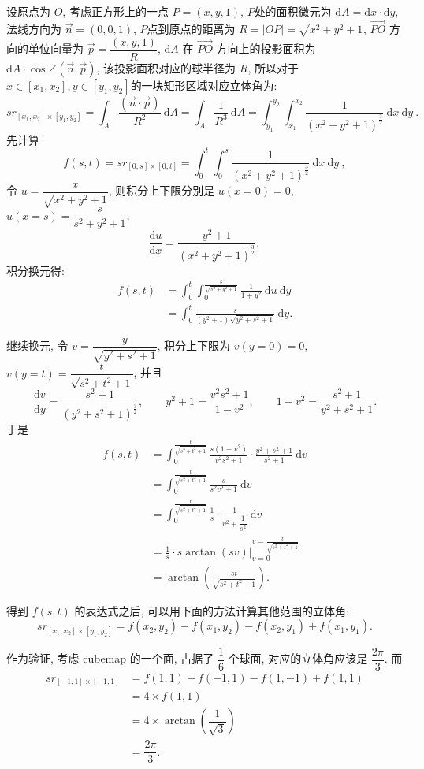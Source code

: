 设原点为 $O$, 考虑正方形上的一点 $P=(x,y,1)$, 
$P$处的面积微元为 $\mathrm{d}A = \mathrm{d}x\cdot\mathrm{d}y$, 法线方向为 $\vec{n} = (0,0,1)$, 
$P$点到原点的距离为 $R = |OP| = \sqrt{x^2+y^2+1}$, $\vec{PO}$ 方向的单位向量为 $\vec{p} = \dfrac{(x,y,1)}{R}$, 
$\mathrm{d}A$ 在 $\vec{PO}$ 方向上的投影面积为 $\mathrm{d}A\cdot\cos\angle(\vec{n},\vec{p})$, 该投影面积对应的球半径为 $R$, 所以对于 $x\in[x_1,x_2], y\in[y_1,y_2]$的一块矩形区域对应立体角为:
\[
sr_{[x_1,x_2]\times[y_1,y_2]} = \int_A\frac{(\vec{n}\cdot\vec{p})}{R^2} \ \mathrm{d}A = \int_A\frac{1}{R^3} \ \mathrm{d}A = \int_{y_1}^{y_2}{\int_{x_1}^{x_2}\frac{1}{(x^2+y^2+1)^{\frac{3}{2}}}\ \mathrm{d}x}\ \mathrm{d}y \ .
\]
先计算 
\[f(s,t) = sr_{[0,s]\times[0,t]} = \int_0^t{\int_0^s\frac{1}{(x^2+y^2+1)^{\frac{3}{2}}}\ \mathrm{d}x}\ \mathrm{d}y\ , \]
令 $u = \dfrac{x}{\sqrt{x^2+y^2+1}}$, 则积分上下限分别是 $u(x=0) = 0$, $u(x=s)=\dfrac{s}{s^2+y^2+1}$, 
\[\dfrac{\mathrm{d}u}{\mathrm{d}x} = \dfrac{y^2+1}{(x^2+y^2+1)^\frac{3}{2}} ,\] 
积分换元得:
\begin{align*}
f(s,t) &= \int_0^t{\int_0^{\frac{s}{\sqrt{s^2+y^2+1}}}{\frac{1}{1+y^2}}\ \mathrm{d}u}\ \mathrm{d}y\\
&=\int_0^t{\frac{s}{(y^2+1)\sqrt{y^2+s^2+1}}}\ \mathrm{d}y . 
\end{align*}

继续换元, 令 $v = \dfrac{y}{\sqrt{y^2+s^2+1}} $, 积分上下限为 $v(y=0) = 0$, $v(y=t) = \dfrac{t}{\sqrt{s^2+t^2+1}}$, 并且
\[\frac{\mathrm{d}v}{\mathrm{d}y} = \frac{s^2+1}{(y^2+s^2+1)^\frac{3}{2}} ,\qquad y^2 + 1 = \frac{v^2s^2+1}{1-v^2} ,\qquad 1-v^2=\frac{s^2+1}{y^2+s^2+1} .\]
于是
\begin{align*}
f(s,t) &= \int_0^\frac{t}{\sqrt{s^2+t^2+1}} {\frac{s(1-v^2)}{v^2s^2+1}\cdot\frac{y^2+s^2+1}{s^2+1}}\ \mathrm{d}v \\ 
&= \int_0^\frac{t}{\sqrt{s^2+t^2+1}}{\frac{s}{s^2v^2+1}}\ \mathrm{d}v\\
&= \int_0^\frac{t}{\sqrt{s^2+t^2+1}}{\frac{1}{s}\cdot\frac{1}{v^2+\dfrac{1}{s^2}}}\ \mathrm{d}v\\
&= \frac{1}{s}\cdot s\arctan(sv)\bigg|_{v=0}^{v=\frac{t}{\sqrt{s^2+t^2+1}}}\\
&= \arctan(\frac{st}{\sqrt{s^2+t^2+1}}) .
\end{align*}

得到 $f(s,t)$ 的表达式之后, 可以用下面的方法计算其他范围的立体角:
\[sr_{[x_1,x_2]\times[y_1,y_2]} = f(x_2,y_2) - f(x_1,y_2) - f(x_2,y_1) + f(x_1,y_1) .\]

作为验证, 考虑 cubemap 的一个面, 占据了 $\dfrac{1}{6}$ 个球面, 对应的立体角应该是 $\dfrac{2\pi}{3}$. 而
\begin{align*}
sr_{[-1,1]\times[-1,1]} &= f(1,1) - f(-1,1) - f(1,-1) + f(1,1) \\
& = 4\times f(1,1) \\
&= 4\times \arctan(\dfrac{1}{\sqrt{3}}) \\
& = \dfrac{2\pi}{3} .
\end{align*} 

\newpage
















